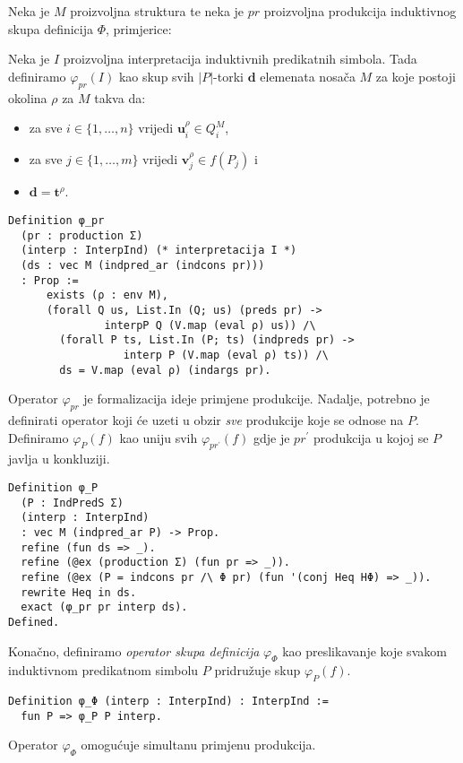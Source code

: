 \begin{definition}
  Neka je \(M\) proizvoljna struktura te neka je \(pr\) proizvoljna produkcija induktivnog skupa definicija \(\Phi\), primjerice:
  \begin{prooftree}
\end{prooftree}
\noindent Neka je \(I\) proizvoljna interpretacija induktivnih predikatnih simbola.
Tada definiramo \(\varphi_{pr}(I)\) kao skup svih \(|P|\)-torki \(\mathbf{d}\) elemenata nosača \(M\) za koje postoji okolina \(\rho\) za \(M\) takva da:
\begin{itemize}
\item za sve \( i \in \{ 1, \ldots, n \} \) vrijedi \( \mathbf{u}_{i}^{\rho} \in Q_{i}^{M} \),
\item za sve \( j \in \{ 1, \ldots, m \} \) vrijedi \( \mathbf{v}_{j}^{\rho} \in f(P_{j}) \) i
\item \(\mathbf{d} = \mathbf{t}^{\rho}\).
\end{itemize}
\begin{verbatim}
Definition φ_pr
  (pr : production Σ)
  (interp : InterpInd) (* interpretacija I *)
  (ds : vec M (indpred_ar (indcons pr)))
  : Prop :=
      exists (ρ : env M),
      (forall Q us, List.In (Q; us) (preds pr) ->
               interpP Q (V.map (eval ρ) us)) /\
        (forall P ts, List.In (P; ts) (indpreds pr) ->
                  interp P (V.map (eval ρ) ts)) /\
        ds = V.map (eval ρ) (indargs pr).
\end{verbatim}
\noindent Operator \(\varphi_{pr}\) je formalizacija ideje primjene produkcije.
Nadalje, potrebno je definirati operator koji će uzeti u obzir \textit{sve} produkcije koje se odnose na \(P\).
Definiramo \(\varphi_{P}(f)\) kao uniju svih \(\varphi_{pr^{\prime}}(f)\)
gdje je \(pr^{\prime}\) produkcija u kojoj se \(P\) javlja u konkluziji.
\begin{verbatim}
Definition φ_P
  (P : IndPredS Σ)
  (interp : InterpInd)
  : vec M (indpred_ar P) -> Prop.
  refine (fun ds => _).
  refine (@ex (production Σ) (fun pr => _)).
  refine (@ex (P = indcons pr /\ Φ pr) (fun '(conj Heq HΦ) => _)).
  rewrite Heq in ds.
  exact (φ_pr pr interp ds).
Defined.
\end{verbatim}
\noindent Konačno, definiramo \textit{operator skupa definicija} \(\varphi_{\Phi}\) kao preslikavanje
koje svakom induktivnom predikatnom simbolu \(P\) pridružuje skup \(\varphi_{P}(f)\).
\begin{verbatim}
Definition φ_Φ (interp : InterpInd) : InterpInd :=
  fun P => φ_P P interp.
\end{verbatim}
\noindent Operator \(\varphi_{\Phi}\) omogućuje simultanu primjenu produkcija.
\end{definition}

